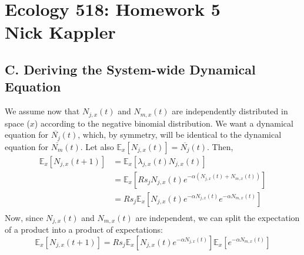 \documentclass[11pt]{amsart}
\newcommand\Ex[0]{\mathbb{E}_x}
\begin{document}
\sffamily
\section*{Ecology 518: Homework 5\\ Nick Kappler}
\subsection*{C. Deriving the System-wide Dynamical Equation}
We assume now that $N_{j,x}(t)$ and $N_{m,x}(t)$ are independently distributed in space ($x$) according to the negative binomial distribution.  We want a dynamical equation for $\overline{N_j}(t)$, which, by symmetry, will be identical to the dynamical equation for $\overline{N_m}(t)$.  Let also $\Ex[N_{j,x}(t)] = \overline{N_{j}}(t)$.  Then, 
\begin{align*}
\Ex[N_{j,x}(t+1)] &= \Ex[\lambda_{j,x}(t)N_{j,x}(t)]\\
&=\Ex[Rs_jN_{j,x}(t)e^{-\alpha(N_{j,x}(t) + N_{m,x}(t))}]\\
&=Rs_j\Ex[N_{j,x}(t)e^{-\alpha N_{j,x}(t)}e^{-\alpha N_{m,x}(t)}]\\
\end{align*}
Now, since $N_{j,x}(t)$ and $N_{m,x}(t)$ are independent, we can split the expectation of a product into a product of expectations:
\[
\Ex[N_{j,x}(t+1)] =Rs_j\Ex[N_{j,x}(t)e^{-\alpha N_{j,x}(t)}]\Ex[e^{-\alpha N_{m,x}(t)}]
\]
\end{document}
